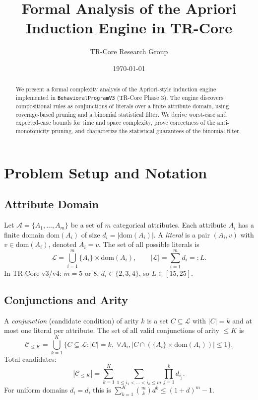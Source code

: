 \documentclass[11pt]{article}
\title{Formal Analysis of the Apriori Induction Engine in TR-Core}
\author{TR-Core Research Group}
\date{\today}
\newcommand{\calA}{\mathcal{A}}
\newcommand{\calC}{\mathcal{C}}
\newcommand{\calL}{\mathcal{L}}
\begin{document}
\maketitle

\begin{abstract}
We present a formal complexity analysis of the Apriori-style induction engine implemented in \texttt{BehavioralProgramV3} (TR-Core Phase 3). The engine discovers compositional rules as conjunctions of literals over a finite attribute domain, using coverage-based pruning and a binomial statistical filter. We derive worst-case and expected-case bounds for time and space complexity, prove correctness of the anti-monotonicity pruning, and characterize the statistical guarantees of the binomial filter.
\end{abstract}

\section{Problem Setup and Notation}

\subsection{Attribute Domain}
Let $\calA = \{A_1, \dots, A_m\}$ be a set of $m$ categorical attributes. Each attribute $A_i$ has a finite domain $\mathrm{dom}(A_i)$ of size $d_i = |\mathrm{dom}(A_i)|$. A \emph{literal} is a pair $(A_i, v)$ with $v \in \mathrm{dom}(A_i)$, denoted $A_i = v$. The set of all possible literals is
\[
\calL = \bigcup_{i=1}^m \{A_i\} \times \mathrm{dom}(A_i), \qquad |\calL| = \sum_{i=1}^m d_i =: L.
\]
In TR-Core v3/v4: $m=5$ or $8$, $d_i \in \{2,3,4\}$, so $L \in [15, 25]$.

\subsection{Conjunctions and Arity}
A \emph{conjunction} (candidate condition) of arity $k$ is a set $C \subseteq \calL$ with $|C| = k$ and at most one literal per attribute. The set of all valid conjunctions of arity $\leq K$ is
\[
\calC_{\leq K} = \bigcup_{k=1}^K \{ C \subseteq \calL : |C|=k,\; \forall A_i, |C \cap (\{A_i\}\times\mathrm{dom}(A_i))| \leq 1 \}.
\]
Total candidates:
\[
|\calC_{\leq K}| = \sum_{k=1}^K \sum_{1 \leq i_1 < \dots < i_k \leq m} \prod_{j=1}^k d_{i_j}.
\]
For uniform domains $d_i = d$, this is $\sum_{k=1}^K \binom{m}{k} d^k \leq (1+d)^m - 1$.
\end{document}
